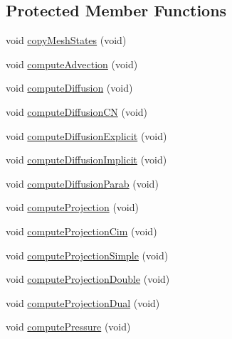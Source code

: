 \subsection*{Protected Member Functions}
\begin{DoxyCompactItemize}
\item 
void \hyperlink{class_incompress___solver___smooth__3_d___cartesian_afc6c5d36842d6c547a45be090f873307}{copy\+Mesh\+States} (void)
\item 
void \hyperlink{class_incompress___solver___smooth__3_d___cartesian_a14ea9d542b42ab712bf22b59a5584b7e}{compute\+Advection} (void)
\item 
void \hyperlink{class_incompress___solver___smooth__3_d___cartesian_aab70b28dad3c6a6493bf0f5ffa688e1e}{compute\+Diffusion} (void)
\item 
void \hyperlink{class_incompress___solver___smooth__3_d___cartesian_ad55dd47d4b8fcc640bbb0f992027ba39}{compute\+Diffusion\+CN} (void)
\item 
void \hyperlink{class_incompress___solver___smooth__3_d___cartesian_aaeb90693f28464217f1905cab6358d3b}{compute\+Diffusion\+Explicit} (void)
\item 
void \hyperlink{class_incompress___solver___smooth__3_d___cartesian_aff5125550a47f0d166a6c98d139c17f5}{compute\+Diffusion\+Implicit} (void)
\item 
void \hyperlink{class_incompress___solver___smooth__3_d___cartesian_a0be8e8269218ea173e4df935ecf3622e}{compute\+Diffusion\+Parab} (void)
\item 
void \hyperlink{class_incompress___solver___smooth__3_d___cartesian_a74c5c4cce7eff56b0162f65ca20454a3}{compute\+Projection} (void)
\item 
void \hyperlink{class_incompress___solver___smooth__3_d___cartesian_a417ae41c054fc7cd3f36d65324545005}{compute\+Projection\+Cim} (void)
\item 
void \hyperlink{class_incompress___solver___smooth__3_d___cartesian_a9948ab87b8764043a78adc66cbaf0906}{compute\+Projection\+Simple} (void)
\item 
void \hyperlink{class_incompress___solver___smooth__3_d___cartesian_afdb007bf3b2542fb01d5c43041008262}{compute\+Projection\+Double} (void)
\item 
void \hyperlink{class_incompress___solver___smooth__3_d___cartesian_acbc7b75da1f65b6e448bb0f6e397982d}{compute\+Projection\+Dual} (void)
\item 
void \hyperlink{class_incompress___solver___smooth__3_d___cartesian_ad84e1f124fee9687edd1c1e438254eed}{compute\+Pressure} (void)

\end{DoxyCompactItemize}
